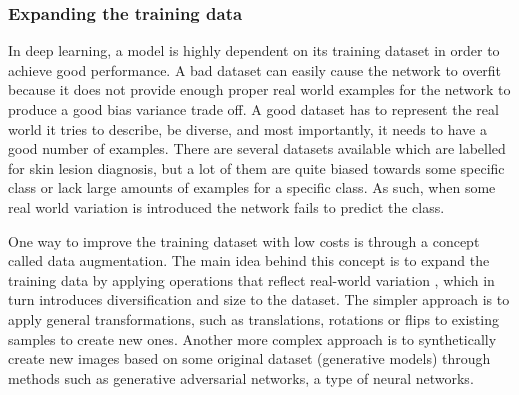 \documentclass[journal,compsoc]{IEEEtran}
\begin{document}
\subsubsection{Expanding the training data}
In deep learning, a model is highly dependent on its training dataset in order to achieve good performance. A bad dataset can easily cause the network to overfit because it does not provide enough proper real world examples for the network to produce a good bias variance trade off. A good dataset has to represent the real world it tries to describe, be diverse, and most importantly, it needs to have a good number of examples.
There are several datasets available which are labelled for skin lesion diagnosis, but a lot of them are quite biased towards some specific class or lack large amounts of examples for a specific class. As such, when some real world variation is introduced the network fails to predict the class. \par
One way to improve the training dataset with low costs is through a concept called data augmentation. The main idea behind this concept is to expand the training data by applying operations that reflect real-world variation \cite{Nielsen2017a}, which in turn introduces diversification and size to the dataset. The simpler approach is to apply general transformations, such as translations, rotations or flips to existing samples to create new ones. Another more complex approach is to synthetically create new images based on some original dataset (generative models) through methods such as generative adversarial networks, a type of neural networks.
\end{document}
